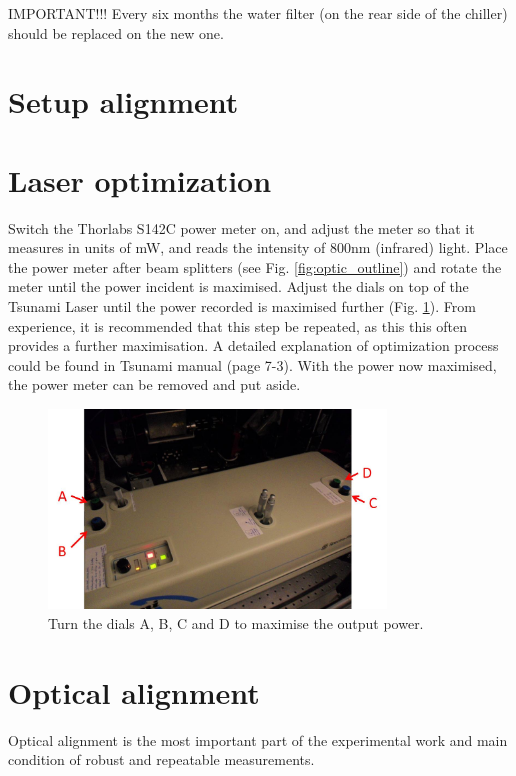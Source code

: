 \documentclass[14pt,a4paper] {article}
\begin{document}
IMPORTANT!!! Every six months the water filter (on the rear side of the chiller) should be replaced on the new one.




\section{Setup alignment}

\section{Laser optimization}
Switch the Thorlabs S142C power meter on, and adjust the meter so that it measures in units of mW, and reads the intensity of 800nm (infrared) light. Place the power meter after beam splitters (see Fig. \ref{fig:optic_outline}) and rotate the meter until the power incident is maximised. 
Adjust the dials on top of the Tsunami Laser until the power recorded is maximised further (Fig. \ref{fig:laser_walking}). From experience, it is recommended that this step be repeated, as this this often provides a further maximisation. A detailed explanation of optimization process could be found in Tsunami manual (page 7-3). With the power now maximised, the power meter can be removed and put aside.

\begin{figure}
\includegraphics[width=0.8\textwidth]{Tsunami-Laser-System.jpg}
\caption{Turn the dials A, B, C and D to maximise the output power.}
\label{fig:laser_walking}
\end{figure}

\section{Optical alignment}
Optical alignment is the most important part of the experimental work and main condition of robust and repeatable measurements.
\end{document}
